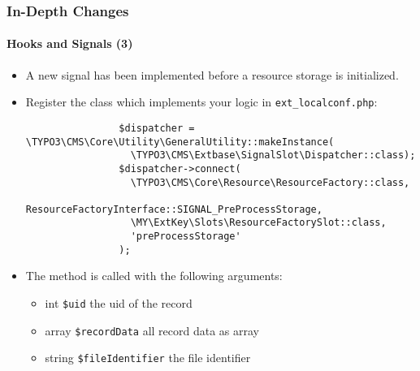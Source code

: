 \begin{frame}[fragile]
	\frametitle{In-Depth Changes}
	\framesubtitle{Hooks and Signals (3)}

	\lstset{basicstyle=\tiny\ttfamily}

	\begin{itemize}

		\item A new signal has been implemented before a resource storage is initialized.

		\item Register the class which implements your logic in \texttt{ext\_localconf.php}:

			\begin{lstlisting}
				$dispatcher = \TYPO3\CMS\Core\Utility\GeneralUtility::makeInstance(
				  \TYPO3\CMS\Extbase\SignalSlot\Dispatcher::class);
				$dispatcher->connect(
				  \TYPO3\CMS\Core\Resource\ResourceFactory::class,
				  ResourceFactoryInterface::SIGNAL_PreProcessStorage,
				  \MY\ExtKey\Slots\ResourceFactorySlot::class,
				  'preProcessStorage'
				);
			\end{lstlisting}

		\item The method is called with the following arguments:

			\begin{itemize}
				\item int \texttt{\$uid} the uid of the record
				\item array \texttt{\$recordData} all record data as array
				\item string \texttt{\$fileIdentifier} the file identifier
			\end{itemize}

	\end{itemize}

\end{frame}

